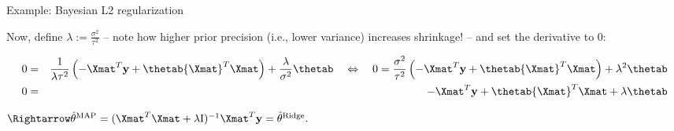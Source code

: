 \begin{vbframe}{Example: Bayesian L2 regularization}
\begin{scriptsize}
\end{scriptsize}

\footnotesize
Now, define $\lambda := \frac{\sigma^2}{\tau^2}$ -- note how higher prior 
precision (i.e., lower variance) increases shrinkage! -- and set the derivative 
to 0:

\begin{scriptsize}
\begin{eqnarray*}
0 &=& \frac{1}{\lambda \tau^2} \left( - {\Xmat}^T \ydat + \thetab {\Xmat}^T \Xmat
\right) + \frac{\lambda}{\sigma^2} \thetab
\quad \Leftrightarrow \quad 0 = \frac{\sigma^2}{\tau^2} \left( - {\Xmat}^T \ydat 
+ \thetab {\Xmat}^T \Xmat \right) + \lambda^2 \thetab \\
0 &=&  - {\Xmat}^T \ydat + \thetab {\Xmat}^T \Xmat + \lambda \thetab 
\end{eqnarray*}
\end{scriptsize}

$\Rightarrow \thetah^{\text{MAP}} = 
(\Xmat^T \Xmat  + \lambda \id)^{-1} \Xmat^T\ydat  = \thetah^{\text{Ridge}}.$

\end{vbframe}







